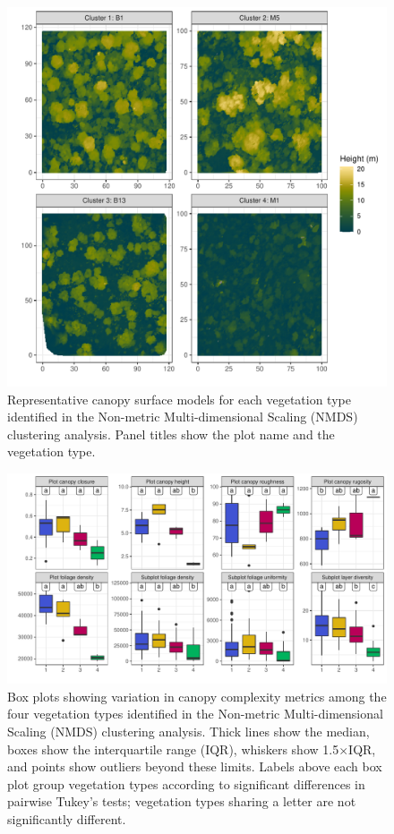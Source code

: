 \documentclass[11pt,a4paper]{article}
\begin{document}
\begin{figure}
	\includegraphics[width=\linewidth]{veg_type_tile}
	\caption{Representative canopy surface models for each vegetation type identified in the Non-metric Multi-dimensional Scaling (NMDS) clustering analysis. Panel titles show the plot name and the vegetation type.}
	\label{veg_type_tile}
\end{figure}

\begin{figure}
	\includegraphics[width=\linewidth]{canopy_metric_box}
	\caption{Box plots showing variation in canopy complexity metrics among the four vegetation types identified in the Non-metric Multi-dimensional Scaling (NMDS) clustering analysis. Thick lines show the median, boxes show the interquartile range (IQR), whiskers show 1.5$\times$IQR, and points show outliers beyond these limits. Labels above each box plot group vegetation types according to significant differences in pairwise Tukey's tests; vegetation types sharing a letter are not significantly different.}
	\label{canopy_metric_box}
\end{figure}
\end{document}
